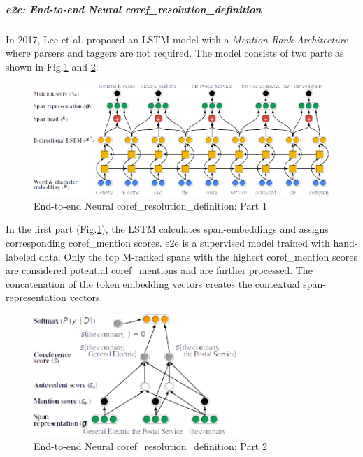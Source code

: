 \subparagraph{e2e: End-to-end Neural \gls{coref_resolution_definition}}
In 2017, Lee et al.\cite{CorefEndToEnd} proposed an LSTM \cite{LSTM} model with a \emph{Mention-Rank-Architecture} where parsers and taggers are not required.
The model consists of two parts as shown in Fig.\ref{fig:e2e1} and \ref{fig:e2e2}:

\begin{figure}[H]   %
    \centering
    \includegraphics[width=1.0\textwidth]{Assets/e2e1}
    \caption{End-to-end Neural \gls{coref_resolution_definition}: Part 1}
    \label{fig:e2e1}
\end{figure}

In the first part (Fig.\ref{fig:e2e1}), the LSTM calculates \gls{span}-embeddings and assigns corresponding \gls{coref_mention} scores.
e2e is a supervised model trained with hand-labeled data.
Only the top M-ranked \glspl{span} with the highest \gls{coref_mention} scores are considered potential \glspl{coref_mention} and are further processed.
The concatenation of the \gls{token} embedding vectors creates the contextual \gls{span}-representation vectors.

\begin{figure}[H]   %
    \centering
    \includegraphics[width=0.7\textwidth]{Assets/e2e2}
    \caption{End-to-end Neural \gls{coref_resolution_definition}: Part 2}
    \label{fig:e2e2}
\end{figure}

